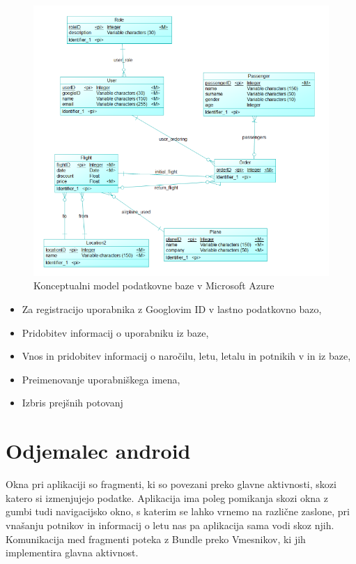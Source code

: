 \documentclass[11pt,a4paper]{article}
\begin{document}
\begin{figure}[htb]
	\centerline{\includegraphics[width=1.0\textwidth]{bazaVAzure.png}}
	\caption{Konceptualni model podatkovne baze v Microsoft Azure}
	\label{sl:koncept}
\end{figure}
\begin{itemize}
	\item Za registracijo uporabnika z Googlovim ID v lastno podatkovno bazo,
	\item Pridobitev informacij o uporabniku iz baze,
	\item Vnos in pridobitev informacij o naročilu, letu, letalu in potnikih v in iz baze,
	\item Preimenovanje uporabniškega imena,
	\item Izbris prejšnih potovanj

\end{itemize}


\section{Odjemalec android}

Okna pri aplikaciji so fragmenti, ki so povezani preko glavne aktivnosti, skozi katero si izmenjujejo podatke.
Aplikacija ima poleg pomikanja skozi okna z gumbi tudi navigacijsko okno, s katerim se lahko vrnemo na različne zaslone, pri vnašanju potnikov in informacij o letu nas pa aplikacija sama vodi skoz njih.
Komunikacija med fragmenti poteka z Bundle preko Vmesnikov, ki jih implementira glavna aktivnost.
\end{document}
